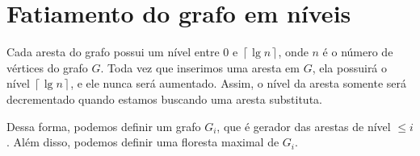 \newpage

\section{Fatiamento do grafo em níveis}

Cada aresta do grafo possui um nível entre $0$ e $\left\lceil \lg n \right\rceil$, onde $n$ é o número de vértices do grafo $G$. Toda vez que inserimos uma aresta em $G$, ela possuirá o nível $\left\lceil \lg n \right\rceil$, e ele nunca será aumentado. Assim, o nível da aresta somente será decrementado quando estamos buscando uma aresta substituta. 

Dessa forma, podemos definir um grafo $G_i$, que é gerador das arestas de nível $\leq i$. Além disso, podemos definir uma floresta maximal de $G_i$.
